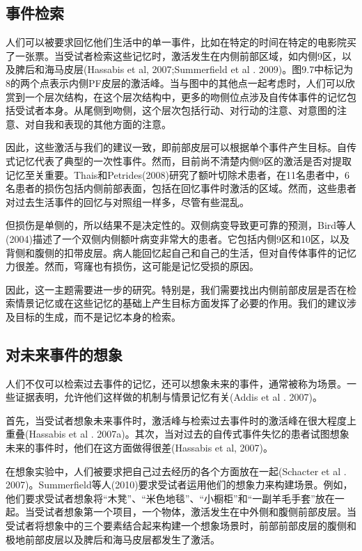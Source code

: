 \subsection{事件检索}
人们可以被要求回忆他们生活中的单一事件，比如在特定的时间在特定的电影院买了一张票。当受试者检索这些记忆时，激活发生在内侧前部区域，如内侧9区，以及脾后和海马皮层(Hassabis et al, 2007;Summerfield et al . 2009)。图9.7中标记为8的两个点表示内侧PF皮层的激活峰。当与图中的其他点一起考虑时，人们可以欣赏到一个层次结构，在这个层次结构中，更多的吻侧位点涉及自传体事件的记忆包括受试者本身。从尾侧到吻侧，这个层次包括行动、对行动的注意、对意图的注意、对自我和表现的其他方面的注意。
\par
因此，这些激活与我们的建议一致，即前部皮层可以根据单个事件产生目标。自传式记忆代表了典型的一次性事件。然而，目前尚不清楚内侧9区的激活是否对提取记忆至关重要。Thais和Petrides(2008)研究了额叶切除术患者，在11名患者中，6名患者的损伤包括内侧前部表面，包括在回忆事件时激活的区域。然而，这些患者对过去生活事件的回忆与对照组一样多，尽管有些混乱。
\par
但损伤是单侧的，所以结果不是决定性的。双侧病变导致更可靠的预测，Bird等人(2004)描述了一个双侧内侧额叶病变非常大的患者。它包括内侧9区和10区，以及背侧和腹侧的扣带皮层。病人能回忆起自己和自己的生活，但对自传体事件的记忆力很差。然而，穹窿也有损伤，这可能是记忆受损的原因。
\par
因此，这一主题需要进一步的研究。特别是，我们需要找出内侧前部皮层是否在检索情景记忆或在这些记忆的基础上产生目标方面发挥了必要的作用。我们的建议涉及目标的生成，而不是记忆本身的检索。
\par
\subsection{对未来事件的想象}
\par
人们不仅可以检索过去事件的记忆，还可以想象未来的事件，通常被称为场景。一些证据表明，允许他们这样做的机制与情景记忆有关(Addis et al . 2007)。

首先，当受试者想象未来事件时，激活峰与检索过去事件时的激活峰在很大程度上重叠(Hassabis et al . 2007a)。其次，当对过去的自传式事件失忆的患者试图想象未来的事件时，他们在这方面做得很差(Hassabis et al, 2007)。

在想象实验中，人们被要求把自己过去经历的各个方面放在一起(Schacter et al . 2007)。Summerfield等人(2010)要求受试者运用他们的想象力来构建场景。例如，他们要求受试者想象将“木凳”、“米色地毯”、“小橱柜”和“一副羊毛手套”放在一起。当受试者想象第一个项目，一个物体，激活发生在中外侧和腹侧前部皮层。当受试者将想象中的三个要素结合起来构建一个想象场景时，前部前部皮层的腹侧和极地前部皮层以及脾后和海马皮层都发生了激活。

